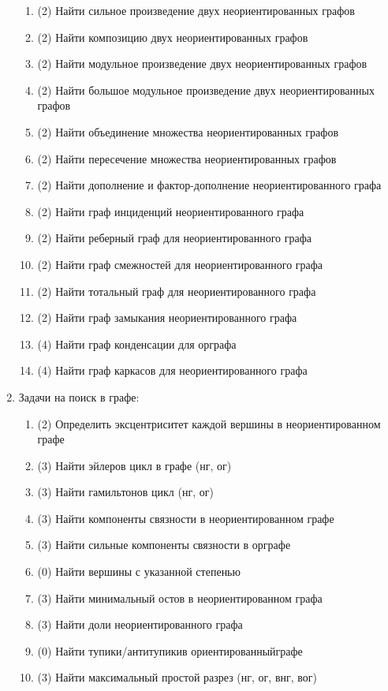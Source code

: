 \begin{enumerate}
\begin{enumerate}[1.]
  \item (2) Найти сильное произведение двух неориентированных графов 
  \item (2) Найти композицию двух неориентированных графов 
  \item (2) Найти модульное произведение двух неориентированных графов 
  \item (2) Найти большое модульное произведение двух неориентированных графов 
  \item (2) Найти объединение множества неориентированных графов 
  \item (2) Найти пересечение множества неориентированных графов 
  \item (2) Найти дополнение и фактор-дополнение неориентированного графа 
  \item (2) Найти граф инциденций неориентированного графа 
  \item (2) Найти реберный граф для неориентированного графа 
  \item (2) Найти граф смежностей для неориентированного графа 
  \item (2) Найти тотальный граф для неориентированного графа 
  \item (2) Найти граф замыкания неориентированного графа  
  \item (4) Найти граф конденсации для орграфа 
  \item (4) Найти граф каркасов для неориентированного графа 
  \end{enumerate}
\item Задачи на поиск в графе:
  \begin{enumerate}[1.]
  \item (2) Определить эксцентриситет каждой вершины в неориентированном графе 
  \item (3) Найти эйлеров цикл в графе (нг, ог)
  \item (3) Найти гамильтонов цикл (нг, ог)
  \item (3) Найти компоненты связности в неориентированном графе 
  \item (3) Найти сильные компоненты связности в орграфе  
  \item (0) Найти вершины с указанной степенью 
  \item (3) Найти минимальный остов в неориентированном графа  
  \item (3) Найти доли неориентированного графа  
  \item (0) Найти тупики/антитупикив ориентированныйграфе 
  \item (3) Найти максимальный простой разрез (нг, ог, внг, вог)

\end{enumerate}
\end{enumerate}
